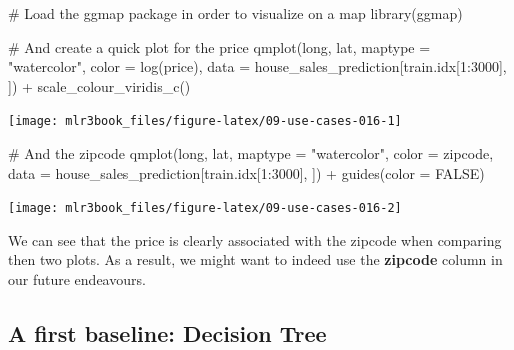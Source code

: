 \documentclass[
  11pt,
  parskip=half,
  DIV=calc,
  BCOR=10mm,
  x11names]{scrbook}
\newenvironment{Shaded}{}{}
\newcommand{\CommentTok}[1]{\textcolor[rgb]{0.00,0.50,0.00}{#1}}
\newcommand{\DataTypeTok}[1]{#1}
\newcommand{\DecValTok}[1]{#1}
\newcommand{\KeywordTok}[1]{\textcolor[rgb]{0.00,0.00,1.00}{#1}}
\newcommand{\NormalTok}[1]{#1}
\newcommand{\OperatorTok}[1]{#1}
\newcommand{\OtherTok}[1]{\textcolor[rgb]{1.00,0.25,0.00}{#1}}
\newcommand{\StringTok}[1]{\textcolor[rgb]{0.00,0.50,0.50}{#1}}
\begin{document}
\begin{Shaded}
\begin{Highlighting}[]
\CommentTok{# Load the ggmap package in order to visualize on a map}
\KeywordTok{library}\NormalTok{(ggmap)}

\CommentTok{# And create a quick plot for the price}
\KeywordTok{qmplot}\NormalTok{(long, lat, }\DataTypeTok{maptype =} \StringTok{"watercolor"}\NormalTok{, }\DataTypeTok{color =} \KeywordTok{log}\NormalTok{(price), }
  \DataTypeTok{data =}\NormalTok{ house_sales_prediction[train.idx[}\DecValTok{1}\OperatorTok{:}\DecValTok{3000}\NormalTok{], ]) }\OperatorTok{+}\StringTok{ }
\StringTok{  }\KeywordTok{scale_colour_viridis_c}\NormalTok{()}
\end{Highlighting}
\end{Shaded}

\begin{center}\texttt{[image: mlr3book\_files/figure-latex/09-use-cases-016-1]} \end{center}

\begin{Shaded}
\begin{Highlighting}[]

\CommentTok{# And the zipcode}
\KeywordTok{qmplot}\NormalTok{(long, lat, }\DataTypeTok{maptype =} \StringTok{"watercolor"}\NormalTok{, }\DataTypeTok{color =}\NormalTok{ zipcode, }
  \DataTypeTok{data =}\NormalTok{ house_sales_prediction[train.idx[}\DecValTok{1}\OperatorTok{:}\DecValTok{3000}\NormalTok{], ]) }\OperatorTok{+}\StringTok{ }
\StringTok{  }\KeywordTok{guides}\NormalTok{(}\DataTypeTok{color =} \OtherTok{FALSE}\NormalTok{)}
\end{Highlighting}
\end{Shaded}

\begin{center}\texttt{[image: mlr3book\_files/figure-latex/09-use-cases-016-2]} \end{center}

We can see that the price is clearly associated with the zipcode when comparing then two plots.
As a result, we might want to indeed use the \textbf{zipcode} column in our future endeavours.

\hypertarget{a-first-baseline-decision-tree}{%
\subsection{A first baseline: Decision Tree}\label{a-first-baseline-decision-tree}}
\end{document}
